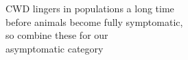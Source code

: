 \documentclass[preview]{standalone}
\begin{document}
\begin{center}
CWD lingers in populations a long time\\before animals become fully symptomatic,\\so combine these for our\\asymptomatic category
\end{center}
\end{document}
